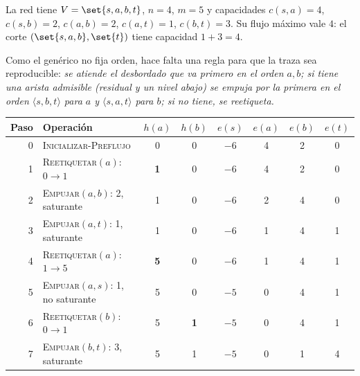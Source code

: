 \documentclass[11pt,letterpaper]{article}
\begin{document}
\begin{ejemplo}
  \label{ej:push-generico}
  La red tiene $V = \set{s, a, b, t}$, $n = 4$, $m = 5$ y capacidades
  $c(s, a) = 4$, $c(s, b) = 2$, $c(a, b) = 2$, $c(a, t) = 1$,
  $c(b, t) = 3$. Su flujo máximo vale $4$: el corte
  $(\set{s, a, b}, \set{t})$ tiene capacidad $1 + 3 = 4$.
  \begin{center}
  \end{center}
  Como el genérico no fija orden, hace falta una regla para que la
  traza sea reproducible: \emph{se atiende el desbordado que va primero
  en el orden $a, b$; si tiene una arista admisible (residual y un
  nivel abajo) se empuja por la primera en el orden
  $\langle s, b, t\rangle$ para $a$ y $\langle s, a, t\rangle$ para
  $b$; si no tiene, se reetiqueta.}
  \begin{center}
  \small
  \begin{tabular}{rlcccccc}
    \toprule
    \textbf{Paso} & \textbf{Operación} & $h(a)$ & $h(b)$
      & $e(s)$ & $e(a)$ & $e(b)$ & $e(t)$ \\
    \midrule
    0 & \textsc{Inicializar-Preflujo} & 0 & 0 & $-6$ & 4 & 2 & 0 \\
    1 & \textsc{Reetiquetar}$(a)$: $0 \to 1$ & \textbf{1} & 0
      & $-6$ & 4 & 2 & 0 \\
    2 & \textsc{Empujar}$(a, b)$: 2, saturante & 1 & 0
      & $-6$ & 2 & 4 & 0 \\
    3 & \textsc{Empujar}$(a, t)$: 1, saturante & 1 & 0
      & $-6$ & 1 & 4 & 1 \\
    4 & \textsc{Reetiquetar}$(a)$: $1 \to 5$ & \textbf{5} & 0
      & $-6$ & 1 & 4 & 1 \\
    5 & \textsc{Empujar}$(a, s)$: 1, no saturante & 5 & 0
      & $-5$ & 0 & 4 & 1 \\
    6 & \textsc{Reetiquetar}$(b)$: $0 \to 1$ & 5 & \textbf{1}
      & $-5$ & 0 & 4 & 1 \\
    7 & \textsc{Empujar}$(b, t)$: 3, saturante & 5 & 1
      & $-5$ & 0 & 1 & 4 \\

\end{tabular}
\end{center}
\end{ejemplo}
\end{document}
